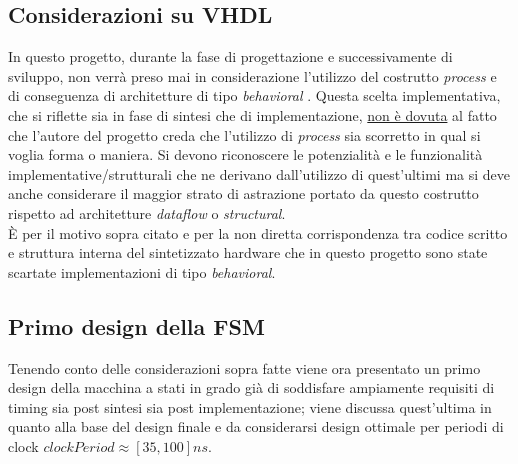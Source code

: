 \documentclass[11pt,a4paper]{article}
\begin{document}
        \subsection{Considerazioni su VHDL}
            In questo progetto, durante la fase di progettazione e successivamente di sviluppo, non verrà preso mai in considerazione l'utilizzo del costrutto \textit{process} e di conseguenza
             di architetture di tipo \textit{behavioral} . Questa scelta implementativa, che si riflette sia in fase di sintesi che di implementazione, \underline{non è dovuta} al fatto che l'autore 
             del progetto creda che l'utilizzo di \textit{process} sia scorretto in qual si voglia forma o maniera. Si devono riconoscere le potenzialità e le funzionalità implementative/strutturali 
             che ne derivano dall'utilizzo di quest'ultimi ma si deve anche considerare il maggior strato di astrazione portato da questo costrutto rispetto ad architetture \textit{dataflow} o \textit{structural}.\\
            È per il motivo sopra citato e per la non diretta corrispondenza tra codice scritto e struttura interna del sintetizzato hardware che in questo progetto sono state scartate implementazioni di tipo \textit{behavioral}.
        \subsection{Primo design della FSM}
            Tenendo conto delle considerazioni sopra fatte viene ora presentato un primo design della macchina a stati in grado già di soddisfare ampiamente requisiti di timing sia post sintesi sia post implementazione; viene discussa quest'ultima in 
            quanto alla base del design finale e da considerarsi design ottimale per periodi di clock $clockPeriod \approx [35,100] ns$.
            \newpage
\end{document}
